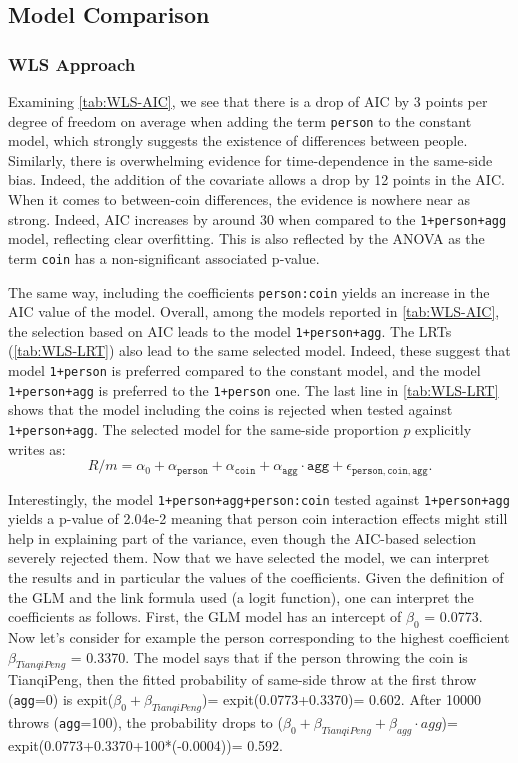 \documentclass[a4paper, 12pt,oneside]{article}
\begin{document}
		\subsection{Model Comparison}
		\subsubsection{WLS Approach}
		Examining \ref{tab:WLS-AIC}, we see that there is a drop of AIC by 3 points per degree of freedom on average when adding the term \texttt{person} to the constant model, which strongly suggests the existence of differences between people. Similarly, there is overwhelming evidence for time-dependence in the same-side bias. Indeed, the addition of the  covariate allows a drop by 12 points in the AIC. When it comes to between-coin differences, the evidence is nowhere near as strong. Indeed, AIC increases by around 30 when compared to the \texttt{1+person+agg} model, reflecting clear overfitting. This is also reflected by the ANOVA as the term \texttt{coin} has a non-significant associated p-value.

		The same way, including the coefficients \texttt{person:coin} yields an increase in the AIC value of the model. 
		Overall, among the models reported in \ref{tab:WLS-AIC}, the selection based on AIC leads to the model \texttt{1+person+agg}. 
		The LRTs (\ref{tab:WLS-LRT}) also lead to the same selected model. Indeed, these suggest that model \texttt{1+person} is preferred compared to the constant model, and the model \texttt{1+person+agg} is preferred to the \texttt{1+person} one. The last line in \ref{tab:WLS-LRT} shows that the model including the coins is rejected when tested against \texttt{1+person+agg}. The selected model for the same-side proportion $p$ explicitly writes as:  
		\begin{equation}
			\label{eq:wls_model}
			R/m = \alpha_0 + \alpha_{\texttt{person}}+\alpha_{\texttt{coin}} +\alpha_{\texttt{agg}}\cdot\texttt{agg} + \epsilon_{\texttt{person},\texttt{coin},\texttt{agg}}.
		\end{equation}   

		Interestingly, the model \texttt{1+person+agg+person:coin} tested against \texttt{1+person+agg} yields a p-value of 2.04e-2 meaning that person coin interaction effects might still help in explaining part of the variance, even though the AIC-based selection severely rejected them. 
		Now that we have selected the model, we can interpret the results and in particular the values of the coefficients. Given the definition of the GLM and the link formula used (a logit function), one can interpret the coefficients as follows. First, the GLM model has an intercept of $\beta_0$ = 0.0773. Now let's consider for example the person corresponding to the highest coefficient $\beta_{TianqiPeng}$ = 0.3370. The model says that if the  person throwing the coin is TianqiPeng, then the fitted probability of same-side throw at the first throw (\texttt{agg}=0) is expit($\beta_0+\beta_{TianqiPeng}$)= expit(0.0773+0.3370)= 0.602. After 10000 throws (\texttt{agg}=100), the probability drops to ($\beta_0+\beta_{TianqiPeng}+\beta_{agg}\cdot agg$)= expit(0.0773+0.3370+100*(-0.0004))= 0.592.
\end{document}
